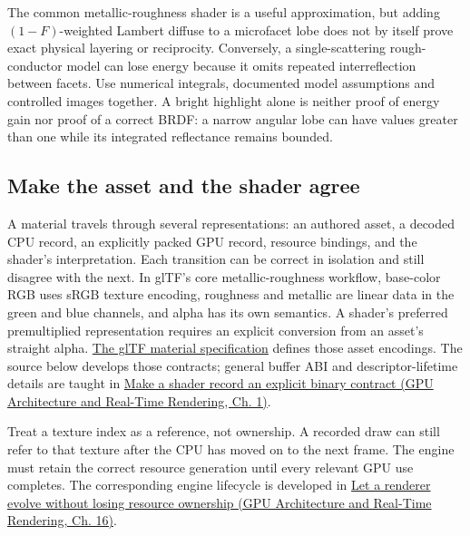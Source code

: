 The common metallic-roughness shader is a useful approximation, but adding \((1-F)\)-weighted Lambert diffuse to a microfacet lobe does not by itself prove exact physical layering or reciprocity. Conversely, a single-scattering rough-conductor model can lose energy because it omits repeated interreflection between facets. Use numerical integrals, documented model assumptions and controlled images together. A bright highlight alone is neither proof of energy gain nor proof of a correct BRDF: a narrow angular lobe can have values greater than one while its integrated reflectance remains bounded.

\subsection{Make the asset and the shader agree}\label{03-visual-computing-i-ch005-make-the-asset-and-the-shader-agree}

\hypertarget{03-visual-computing-i-ch005-make-the-asset-and-the-shader-agree}{}

A material travels through several representations: an authored asset, a decoded CPU record, an explicitly packed GPU record, resource bindings, and the shader's interpretation. Each transition can be correct in isolation and still disagree with the next. In glTF's core metallic-roughness workflow, base-color RGB uses sRGB texture encoding, roughness and metallic are linear data in the green and blue channels, and alpha has its own semantics. A shader's preferred premultiplied representation requires an explicit conversion from an asset's straight alpha. \href{https://raw.githubusercontent.com/KhronosGroup/glTF/main/specification/2.0/Specification.adoc}{The glTF material specification} defines those asset encodings. The source below develops those contracts; general buffer ABI and descriptor-lifetime details are taught in \href{../06-GPU-Architecture-and-Real-Time-Rendering/main.pdf\#nameddest=01-foundations-i-ch008-make-a-shader-record-an-explicit-binary-contract}{Make a shader record an explicit binary contract (GPU Architecture and Real-Time Rendering, Ch. 1)}.

Treat a texture index as a reference, not ownership. A recorded draw can still refer to that texture after the CPU has moved on to the next frame. The engine must retain the correct resource generation until every relevant GPU use completes. The corresponding engine lifecycle is developed in \href{../06-GPU-Architecture-and-Real-Time-Rendering/main.pdf\#nameddest=06-engine-ii-ch025-let-a-renderer-evolve-without-losing-resource-ownership}{Let a renderer evolve without losing resource ownership (GPU Architecture and Real-Time Rendering, Ch. 16)}.

